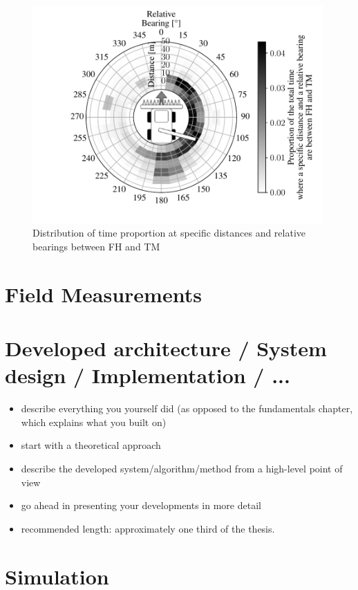 \documentclass[]{nsm-thesis}
\begin{document}
\begin{figure}%
	\centering
	\includegraphics[width=0.99\textwidth]{figures/bearingHarvestScenario.pdf}
	\caption{Distribution of time proportion at specific distances and relative bearings between \ac{FH} and \ac{TM}}%
	\label{fig:bearing}%
\end{figure}
\chapter{Field Measurements}


\chapter{Developed architecture / System design / Implementation / ...}


\begin{itemize}
\item describe everything you yourself did (as opposed to the fundamentals chapter, which explains what you built on)
\item start with a theoretical approach
\item describe the developed system/algorithm/method from a high-level point of view
\item go ahead in presenting your developments in more detail
\item recommended length: approximately one third of the thesis.
\end{itemize}

\chapter{Simulation}
\end{document}
